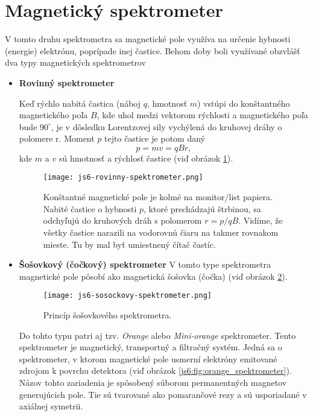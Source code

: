 \documentclass[../../main.tex]{subfiles}
\begin{document}
\section{Magnetický spektrometer}
V tomto druhu spektrometra sa magnetické pole využíva na určenie hybnosti (energie) elektrónu, poprípade inej častice. 
Behom doby boli využívané obzvlášť dva typy magnetických spektrometrov
\begin{itemize}
	\item \textbf{Rovinný spektrometer}\par
	Keď rýchlo nabitá častica (náboj $q$, hmotnosť $m$) vstúpi do konštantného magnetického poľa $B$, kde uhol medzi vektorom rýchlosti a magnetického poľa bude $90^{\circ}$, je v dôsledku Lorentzovej sily vychýlená do kruhovej dráhy o polomere r. Moment $p$ tejto častice je potom daný
	$$ p=mv=qBr, $$
	kde $m$ a $v$ sú hmotnosť a rýchlosť častice (viď obrázok \ref{js6:fig:rovinny_spektrometer}).\par
	\begin{figure}[!h]
	\centering
	\texttt{[image: js6-rovinny-spektrometer.png]}
	\caption{Konštantné magnetické pole je kolmé na monitor/list papiera. Nabité častice o hybnosti $p$, ktoré prechádzajú štrbinou, sa odchyľujú do kruhových dráh s polomerom $r=p/qB$. Vidíme, že všetky častice narazili na vodorovnú čiaru na takmer rovnakom mieste. Tu by mal byť umiestnený čítač častíc.}
	\label{js6:fig:rovinny_spektrometer}
	\end{figure}
	\item \textbf{Šošovkový (čočkový) spektrometer}
	V tomto type spektrometra magnetické pole pôsobí ako magnetická šošovka (čočka) (viď obrázok \ref{js6:fig:sosovkovy_spektrometer}).
	\begin{figure}[!h]
	\centering
	\texttt{[image: js6-sosockovy-spektrometer.png]}
	\caption{Princíp šošovkového spektrometra.}
	\label{js6:fig:sosovkovy_spektrometer}
	\end{figure} \newline
	Do tohto typu patri aj tzv. \textit{Orange} alebo \textit{Mini-orange} spektrometer. Tento spektrometer je magnetický, transportný a filtračný systém. Jedná sa o spektrometer, v ktorom magnetické pole usmerní elektróny emitované zdrojom k povrchu detektora (viď obrázok \ref{js6:fig:orange_spektrometer}). Názov tohto zariadenia je spôsobený súborom permanentných magnetov generujúcich pole. Tie sú tvarované ako pomarančové rezy a sú usporiadané v axiálnej symetrii.\par

\end{itemize}
\end{document}
